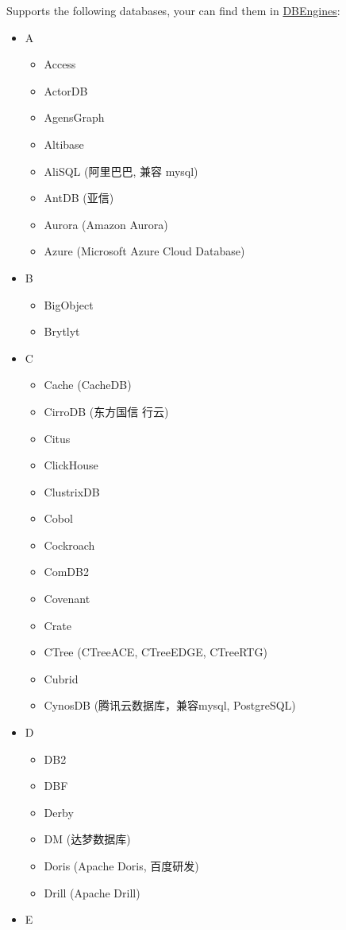 \documentclass[
]{book}
\providecommand{\tightlist}{%
  \setlength{\itemsep}{0pt}\setlength{\parskip}{0pt}}
\begin{document}
Supports the following databases, your can find them in \href{https://db-engines.com/en/ranking/relational+dbms}{DBEngines}:

\begin{itemize}
\tightlist
\item
  A

  \begin{itemize}
  \tightlist
  \item
    Access
  \item
    ActorDB
  \item
    AgensGraph
  \item
    Altibase
  \item
    AliSQL (阿里巴巴, 兼容 mysql)
  \item
    AntDB (亚信)
  \item
    Aurora (Amazon Aurora)
  \item
    Azure (Microsoft Azure Cloud Database)
  \end{itemize}
\item
  B

  \begin{itemize}
  \tightlist
  \item
    BigObject
  \item
    Brytlyt
  \end{itemize}
\item
  C

  \begin{itemize}
  \tightlist
  \item
    Cache (CacheDB)
  \item
    CirroDB (东方国信 行云)
  \item
    Citus
  \item
    ClickHouse
  \item
    ClustrixDB
  \item
    Cobol
  \item
    Cockroach
  \item
    ComDB2
  \item
    Covenant
  \item
    Crate
  \item
    CTree (CTreeACE, CTreeEDGE, CTreeRTG)
  \item
    Cubrid
  \item
    CynosDB (腾讯云数据库，兼容mysql, PostgreSQL)\\
  \end{itemize}
\item
  D

  \begin{itemize}
  \tightlist
  \item
    DB2
  \item
    DBF
  \item
    Derby
  \item
    DM (达梦数据库)
  \item
    Doris (Apache Doris, 百度研发)
  \item
    Drill (Apache Drill)\\
  \end{itemize}
\item
  E


\end{itemize}
\end{document}
